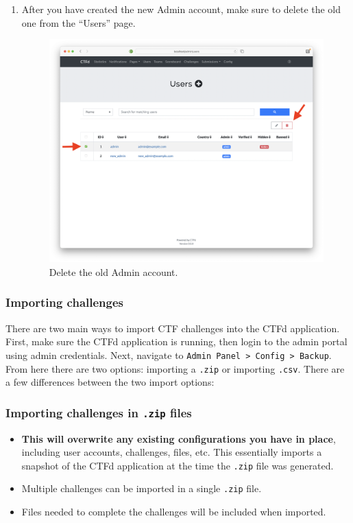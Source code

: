 \documentclass[11pt]{article}
\begin{document}
\begin{enumerate}
	\item After you have created the new Admin account, make sure to delete the old one from the ``Users'' page.
			
	\begin{figure}[H]
		\centering
	   \includegraphics[width=\textwidth]{delete_old_admin.png}
  	   \caption{Delete the old Admin account.}
	\end{figure}

\end{enumerate}

\subsubsection{Importing challenges}

There are two main ways to import CTF challenges into the CTFd application.
First, make sure the CTFd application is running, then login to the admin portal using admin credentials.
Next, navigate to \texttt{Admin Panel > Config > Backup}.
From here there are two options: importing a \texttt{.zip} or importing \texttt{.csv}.
There are a few differences between the two import options:

\subsubsection{Importing challenges in \texttt{.zip} files}

\begin{itemize}
   \item \textbf{This will overwrite any existing configurations you have in place}, including user accounts, challenges, files, etc. This essentially imports a snapshot of the CTFd application at the time the \texttt{.zip} file was generated.
   \item Multiple challenges can be imported in a single \texttt{.zip} file.
   \item Files needed to complete the challenges will be included when imported.
\end{itemize}
\end{document}
